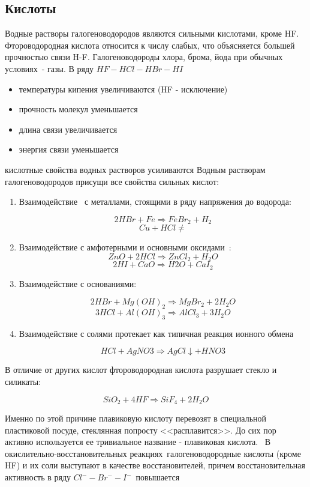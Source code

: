 \documentclass[11pt]{article}
\begin{document}
\subsection{Кислоты}
Водные растворы галогеноводородов являются сильными кислотами, кроме HF. Фтороводородная
кислота относится к числу слабых, что объясняется большей прочностью связи H-F.
Галогеноводороды хлора, брома, йода при обычных условиях - газы. 
В ряду $HF - HCl - HBr - HI$
\begin{itemize}
\item температуры кипения увеличиваются (HF - исключение)
\item прочность молекул уменьшается
\item длина связи увеличивается
\item энергия связи уменьшается
\end{itemize}
кислотные свойства водных растворов усиливаются
Водным растворам галогеноводородов присущи все свойства сильных кислот:
\begin{enumerate}
\item Взаимодействие  с металлами, стоящими в ряду напряжения до водорода:

$$2HBr+Fe \Rightarrow FeBr_2+H_2$$
$$Cu+HCl\ne$$

\item Взаимодействие с амфотерными и основными оксидами :
$$ZnO+2HCl\Rightarrow ZnCl_2+H_2O$$
$$2HI+CaO\Rightarrow H2O+CaI_2$$

\item Взаимодействие с основаниями:

$$2HBr+Mg(OH)_2\Rightarrow MgBr_2+2H_2O$$
$$3HCl+Al(OH)_3 \Rightarrow AlCl_3+3H_2O$$

\item Взаимодействие с солями протекает как типичная реакция ионного обмена 

$$HCl+AgNO3\Rightarrow AgCl\downarrow+HNO3$$

\end{enumerate}

В отличие от других кислот фтороводородная кислота разрушает стекло и силикаты:

$$SiO_2+4HF\Rightarrow SiF_4+2H_2O$$

Именно по этой причине плавиковую кислоту перевозят в специальной пластиковой посуде,
стеклянная попросту <<расплавится>>. До сих пор активно используется ее тривиальное название -
плавиковая кислота. 
В окислительно-восстановительных реакциях галогеноводородные кислоты (кроме HF) и их
соли выступают в качестве восстановителей, причем восстановительная активность в
ряду $Cl^- - Br^- - I^-$ повышается
\end{document}
